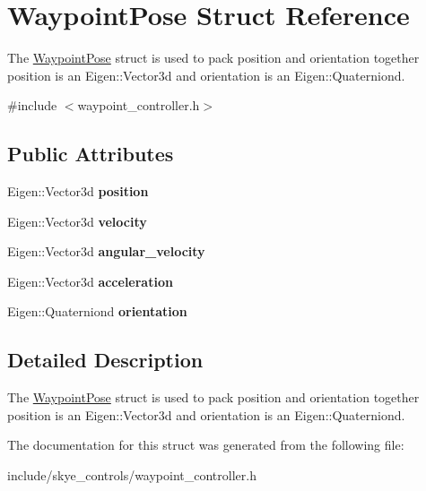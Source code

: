 \hypertarget{struct_waypoint_pose}{\section{Waypoint\-Pose Struct Reference}
\label{struct_waypoint_pose}
}


The \hyperlink{struct_waypoint_pose}{Waypoint\-Pose} struct is used to pack position and orientation together position is an Eigen\-::\-Vector3d and orientation is an Eigen\-::\-Quaterniond.  




{\ttfamily \#include $<$waypoint\-\_\-controller.\-h$>$}

\subsection*{Public Attributes}
\begin{DoxyCompactItemize}
\item 
\hypertarget{struct_waypoint_pose_a4c14b1d687197e91103b42de17f7234a}{Eigen\-::\-Vector3d {\bfseries position}}\label{struct_waypoint_pose_a4c14b1d687197e91103b42de17f7234a}

\item 
\hypertarget{struct_waypoint_pose_a7721651643e8d44dc5fd3e75c82caaa1}{Eigen\-::\-Vector3d {\bfseries velocity}}\label{struct_waypoint_pose_a7721651643e8d44dc5fd3e75c82caaa1}

\item 
\hypertarget{struct_waypoint_pose_adce90178cc0e3a8f36d6a05b3a266069}{Eigen\-::\-Vector3d {\bfseries angular\-\_\-velocity}}\label{struct_waypoint_pose_adce90178cc0e3a8f36d6a05b3a266069}

\item 
\hypertarget{struct_waypoint_pose_ad8b52d815e3b3b18ffc04343819dd2bb}{Eigen\-::\-Vector3d {\bfseries acceleration}}\label{struct_waypoint_pose_ad8b52d815e3b3b18ffc04343819dd2bb}

\item 
\hypertarget{struct_waypoint_pose_add7868caf7e885948e09b95a71dc3e58}{Eigen\-::\-Quaterniond {\bfseries orientation}}\label{struct_waypoint_pose_add7868caf7e885948e09b95a71dc3e58}

\end{DoxyCompactItemize}


\subsection{Detailed Description}
The \hyperlink{struct_waypoint_pose}{Waypoint\-Pose} struct is used to pack position and orientation together position is an Eigen\-::\-Vector3d and orientation is an Eigen\-::\-Quaterniond. 

The documentation for this struct was generated from the following file\-:\begin{DoxyCompactItemize}
\item 
include/skye\-\_\-controls/waypoint\-\_\-controller.\-h\end{DoxyCompactItemize}
